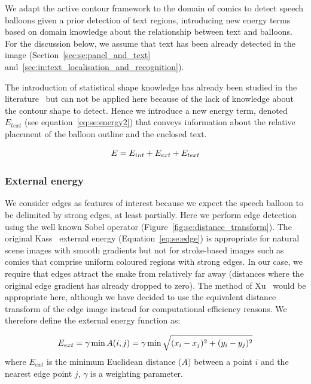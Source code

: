 We adapt the active contour framework to the domain of comics to detect speech balloons given a prior detection of text regions, introducing new energy terms based on domain knowledge about the relationship between text and balloons.
For the discussion below, we assume that text has been already detected in the image (Section~\ref{sec:se:panel_and_text} and~\ref{sec:in:text_localisation_and_recognition}).%

The introduction of statistical shape knowledge has already been studied in the literature~\cite{Cremers2002} but can not be applied here because of the lack of knowledge about the contour shape to detect.
Hence we introduce a new energy term, denoted $E_{text}$ (see equation~\ref{eq:se:energy2}) that conveys information about the relative placement of the balloon outline and the enclosed text.

\begin{equation}\label{eq:se:energy2}
  E = E_{int} + E_{ext} + E_{text}\\
\end{equation}

\subsubsection{External energy}
\label{sec:se:external_energie}

We consider edges as features of interest because we expect the speech balloon to be delimited by strong edges, at least partially.
Here we perform edge detection using the well known Sobel operator (Figure~\ref{fig:se:distance_transform}).
The original Kass~\cite{Kass1988} external energy (Equation~\ref{eq:se:edge}) is appropriate for natural scene images with smooth gradients but not for stroke-based images such as comics that comprise uniform coloured regions with strong edges.
In our case, we require that edges attract the snake from relatively far away (distances where the original edge gradient has already dropped to zero).
The method of Xu~\cite{Xu1998} would be appropriate here, although we have decided to use the equivalent distance transform of the edge image instead for computational efficiency reasons.
We therefore define the external energy function as:

\begin{equation}\label{eq:se:energy3}
  E_{ext} = \gamma \min A(i,j) = \gamma \min  \sqrt{(x_i-x_j)^2+(y_i-y_j)^2}\\
\end{equation}
where $E_{ext}$ is the minimum Euclidean distance ($A$) between a point $i$ and the nearest edge point $j$, $\gamma$ is a weighting parameter.

